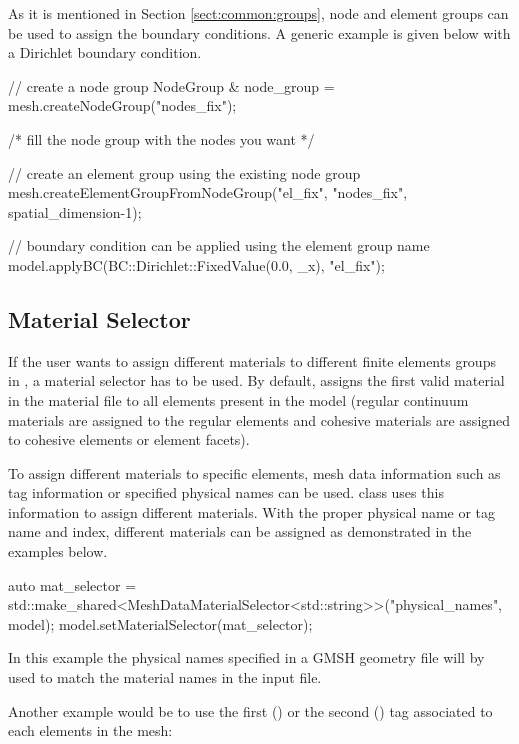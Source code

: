 As it is mentioned in Section \ref{sect:common:groups}, node and
element groups can be used to assign the boundary conditions. A
generic example is given below with a Dirichlet boundary condition.

\begin{cpp}
  // create a node group
  NodeGroup & node_group = mesh.createNodeGroup("nodes_fix");

  /*
  fill the node group with the nodes you want
  */

  // create an element group using the existing node group
  mesh.createElementGroupFromNodeGroup("el_fix", "nodes_fix", spatial_dimension-1);

  // boundary condition can be applied using the element group name
  model.applyBC(BC::Dirichlet::FixedValue(0.0, _x), "el_fix");
\end{cpp}

\subsection{Material Selector\label{sect:smm:materialselector}}

If the user wants to assign different materials to different
finite elements groups in \akantu, a material selector has to be
used. By default, \akantu assigns the first valid material in the
material file to all elements present in the model (regular continuum
materials are assigned to the regular elements and cohesive materials
are assigned to cohesive elements or element facets).

To assign different materials to specific elements, mesh data
information such as tag information or specified physical names can be
used.  class uses this information to
assign different materials. With the proper physical name or tag name
and index, different materials can be assigned as demonstrated in the
examples below.

\begin{cpp}
  auto mat_selector = std::make_shared<MeshDataMaterialSelector<std::string>>("physical_names", model);
  model.setMaterialSelector(mat_selector);
\end{cpp}

In this example the physical names specified in a GMSH geometry file will by
used to match the material names in the input file.

Another example would be to use the first () or the second
() tag associated to each elements in the mesh:

